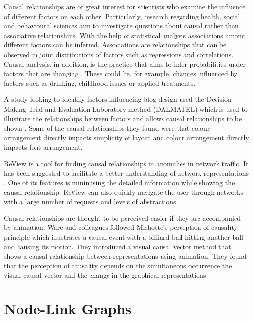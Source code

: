 \documentclass{l4proj}
\begin{document}
Causal relationships are of great interest for scientists who examine the influence of different factors on each other. Particularly, research regarding health, social and behavioural sciences aim to investigate questions about causal rather than associative relationships. With the help of statistical analysis associations among different factors can be inferred. Associations are relationships that can be observed in joint distributions of factors such as regressions and correlations. Causal analysis, in addition, is the practice that aims to infer probabilities under factors that are changing \cite{pearl2010introduction}. These could be, for example, changes influenced by factors such as drinking, childhood issues or applied treatments. 

A study looking to identify factors influencing blog design used the Decision Making Trial and Evaluation Laboratory method (DALMATEL) which is used to illustrate the relationships between factors and allows causal relationships to be shown \cite{hsu2012evaluation}. Some of the causal relationships they found were that colour arrangement directly impacts simplicity of layout and colour arrangement directly impacts font arrangement. 

ReView is a tool for finding causal relationships in anomalies in network traffic. It has been suggested to facilitate a better understanding of network representations \cite{Zhang:2015:VTC:2713579.2713583}. One of its features is minimising the detailed information while showing the causal relationship. ReView can also quickly navigate the user through networks with a large number of requests and levels of abstractions.

Causal relationships are thought to be perceived easier if they are accompanied by animation. Ware and colleagues \cite{ware1999visualizing} followed Michotte's perception of causality principle which illustrates a causal event with a billiard ball hitting another ball and causing its motion. They introduced a visual causal vector method that shows a causal relationship between representations using animation. They found that the perception of causality depends on the simultaneous occurrence the visual causal vector and the change in the graphical representations. 

\section{Node-Link Graphs}
\end{document}
